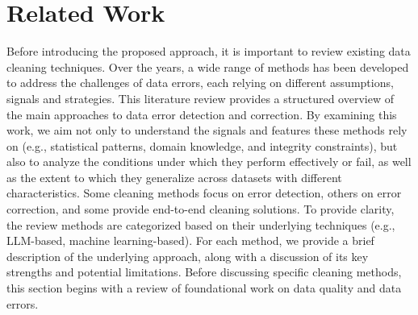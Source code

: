 \chapter{Related Work}
Before introducing the proposed approach, it is important to review existing data cleaning techniques. 
Over the years, a wide range of methods has been developed to address the challenges of data errors, each relying on different assumptions, signals and strategies. 
This literature review provides a structured overview of the main approaches to data error detection and correction. 
By examining this work, we aim not only to understand the signals and features these methods rely on (e.g., statistical patterns, domain knowledge, and integrity constraints), but also to analyze the conditions under which they perform effectively or fail, as well as the extent to which they generalize across datasets with different characteristics.
Some cleaning methods focus on error detection, others on error correction, and some provide end-to-end cleaning solutions. 
To provide clarity, the review methods are categorized based on their underlying techniques (e.g., LLM-based, machine learning-based).
For each method, we provide a brief description of the underlying approach, along with a discussion of its key strengths and potential limitations.
Before discussing specific cleaning methods, this section begins with a review of foundational work on data quality and data errors.

